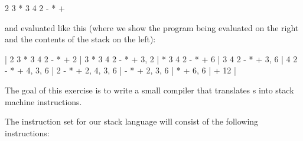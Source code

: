 \documentclass[12pt]{report}
\begin{document}
      2 3 * 3 4 2 - * +


   and evaluated like this (where we show the program being evaluated
   on the right and the contents of the stack on the left):


                  |    2 3 * 3 4 2 - * +
      2           |    3 * 3 4 2 - * +
      3, 2        |    * 3 4 2 - * +
      6           |    3 4 2 - * +
      3, 6        |    4 2 - * +
      4, 3, 6     |    2 - * +
      2, 4, 3, 6  |    - * +
      2, 3, 6     |    * +
      6, 6        |    +
      12          |


  The goal of this exercise is to write a small compiler that
  translates s into stack machine instructions.


  The instruction set for our stack language will consist of the
  following instructions:
\end{document}
